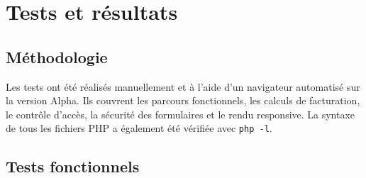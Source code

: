 \section{Tests et résultats}

\subsection{Méthodologie}

Les tests ont été réalisés manuellement et à l'aide d'un navigateur automatisé sur la version Alpha. Ils couvrent les parcours fonctionnels, les calculs de facturation, le contrôle d'accès, la sécurité des formulaires et le rendu responsive. La syntaxe de tous les fichiers PHP a également été vérifiée avec \texttt{php -l}.

\subsection{Tests fonctionnels}

